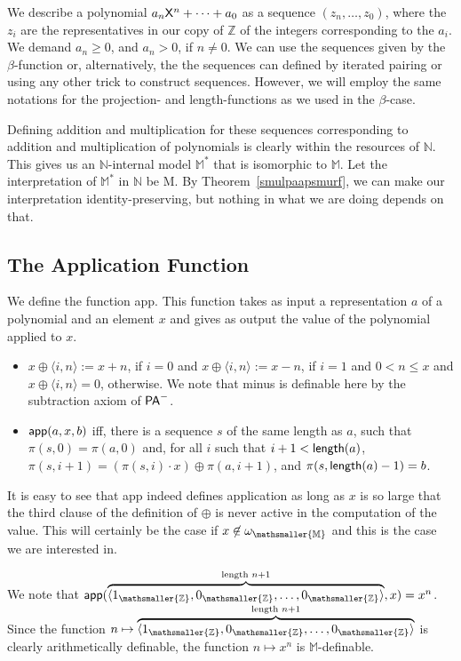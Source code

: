 \documentclass{amsart}
\renewcommand{\leq}{\leqslant}
\renewcommand{\geq}{\geqslant}
\newcommand{\tupel}[1]{{\langle #1 \rangle}}
\newcommand{\pam}{\ensuremath{{\sf PA}^{-}}}
\newcommand{\mbbs}[1]{\ensuremath{\mathsmaller{\mathbb{#1}}}}
\begin{document}
We describe a polynomial $a_n{\sf X}^n+\dots+ a_0$ as a sequence $(z_n,\dots, z_0)$, where
the $z_i$ are the representatives in our copy of $\mathbb Z$ of the integers corresponding to the $a_i$.
We demand $a_n \geq 0$, and $a_n>0$, if $n\neq 0$.
We can use the sequences given by the $\beta$-function or, alternatively, the
the sequences can defined by iterated pairing or using any other trick to construct sequences. 
However, we will employ the same notations for the projection- and length-functions
as we used in the $\beta$-case.

Defining addition and multiplication for these sequences corresponding to addition and multiplication of polynomials is clearly within the resources
of $\mathbb N$. This gives us an $\mathbb N$-internal model $\mathbb M^\ast$ that is
isomorphic to $\mathbb M$.  
Let the interpretation of $\mathbb M^\ast$ in $\mathbb N$ be {\sf M}. 
By Theorem~\ref{smulpaapsmurf}, we can make our interpretation identity-preserving, but nothing in what we are doing depends on that.

\subsection{The Application Function}\label{toepassingsgerichtesmurf}
We define the function {\sf app}. 
This function takes as input a representation $a$ of a polynomial and an element $x$ and gives as output the
value of the polynomial applied to $x$.
\begin{itemize}
\item 
$x\oplus \tupel{i,n} := x+n$, if $i=0$ and $x\oplus \tupel{i,n} := x-n$, if $i=1$ and $0<n\leq x$ and
$x \oplus \tupel{i,n} = 0$, otherwise. We note that minus is definable here by the subtraction axiom of
\pam.
\item
    ${\sf app}(a,x,b)$ iff, there is a sequence $s$ of the same length as $a$, such that $\pi(s,0) = \pi(a,0)$ and, 
    for all $i$ such that $i+1 <{\sf length}(a)$, 
    $\pi(s,i+1)= (\pi(s,i)\cdot x) \oplus \pi(a,i+1)$, and
    $\pi(s,{\sf length}(a)-1)=b$.
\end{itemize}
It is easy to see that {\sf app} indeed defines application as long as $x$ is so large that
the third clause of the definition of $\oplus$ is never active in the computation of the value.
This will certainly be the case if $x\not \in \omega_{\mbbs{M}}$ and this is the case we are interested in.

We note that ${\sf app}(\overbrace{\tupel{1_{\mbbs{Z}},0_{\mbbs{Z}},\dots,0_{\mbbs{Z}}}}^{\text{length } n+1},x) = x^n$. Since the function
$n \mapsto \overbrace{\tupel{1_{\mbbs{Z}},0_{\mbbs{Z}},\dots,0_{\mbbs{Z}}}}^{\text{length } n+1}$ is clearly arithmetically definable,
the function $n \mapsto x^n$ is $\mathbb M$-definable.
\end{document}
